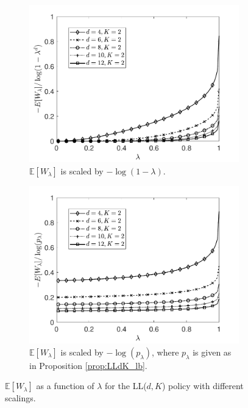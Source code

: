 \documentclass[12pt]{report}
\newcommand{\E}{\mathbb{E}}
\begin{document}
\begin{figure}[t]
\begin{subfigure}{0.45\textwidth}
\centering
\captionsetup{width=.8\linewidth}
\includegraphics[width=1\linewidth]{figures/Chapter5/fig3a.pdf}
\caption{$\E[W_\lambda]$ is scaled by $-\log(1-\lambda)$.}
\label{fig2a_heavy}
\end{subfigure}
\begin{subfigure}{0.45\textwidth}
\centering
\captionsetup{width=.8\linewidth}
\includegraphics[width=1\linewidth]{figures/Chapter5/fig3b.pdf}
\caption{$\E[W_\lambda]$ is scaled by $-\log(p_\lambda)$, where $p_\lambda$ is given as in Proposition \ref{prop:LLdK_lb}.}
\label{fig2b_heavy}
\end{subfigure}
\caption{$\E[W_\lambda]$ as a function of $\lambda$ for the LL($d, K$) policy with
different scalings.}
\label{fig2_heavy}
\end{figure}
\end{document}
